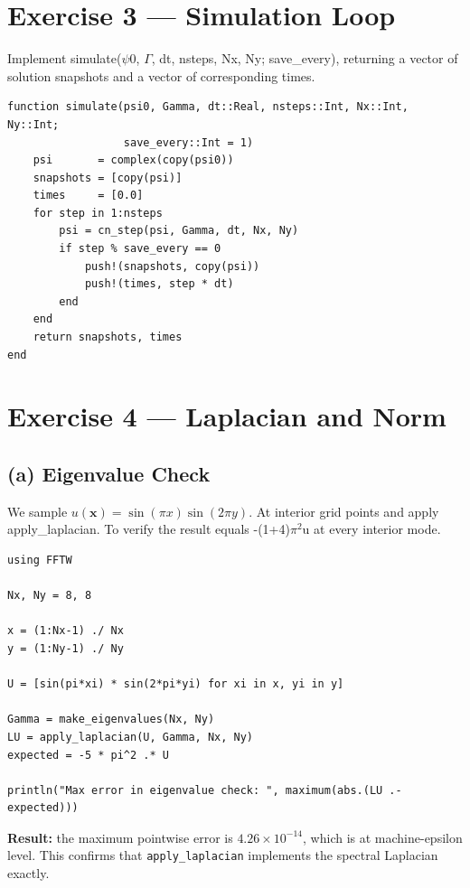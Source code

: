 \documentclass[11pt,a4paper]{article}
\begin{document}
\section{Exercise 3 — Simulation Loop}

Implement simulate($\psi$0, $\Gamma$, dt, nsteps, Nx, Ny; save\_every), returning a vector of solution snapshots and a vector of corresponding times.

\begin{lstlisting}
function simulate(psi0, Gamma, dt::Real, nsteps::Int, Nx::Int, Ny::Int;
                  save_every::Int = 1)
    psi       = complex(copy(psi0))
    snapshots = [copy(psi)]
    times     = [0.0]
    for step in 1:nsteps
        psi = cn_step(psi, Gamma, dt, Nx, Ny)
        if step % save_every == 0
            push!(snapshots, copy(psi))
            push!(times, step * dt)
        end
    end
    return snapshots, times
end
\end{lstlisting}

\section{Exercise 4 — Laplacian and Norm}

\subsection*{(a) Eigenvalue Check}

We sample $u(\mathbf{x}) = \sin(\pi x)\sin(2\pi y)$.
At interior grid points and apply apply\_laplacian. To verify the result equals -(1+4)$\pi^2$u at every interior mode.

\begin{lstlisting}
using FFTW

Nx, Ny = 8, 8  

x = (1:Nx-1) ./ Nx
y = (1:Ny-1) ./ Ny

U = [sin(pi*xi) * sin(2*pi*yi) for xi in x, yi in y]

Gamma = make_eigenvalues(Nx, Ny)
LU = apply_laplacian(U, Gamma, Nx, Ny)
expected = -5 * pi^2 .* U

println("Max error in eigenvalue check: ", maximum(abs.(LU .- expected)))
\end{lstlisting}

\textbf{Result:} the maximum pointwise error is $4.26\times10^{-14}$,
which is at machine-epsilon level. This confirms that
\texttt{apply\_laplacian} implements the spectral Laplacian exactly.
\end{document}
